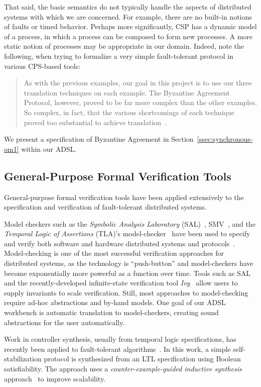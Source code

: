 That said, the basic semantics do not typically handle the aspects of distributed systems
with which we are concerned. For example, there are no built-in notions of
faults or timed behavior. Perhaps more significantly, CSP has a dynamic
model of a process, in which a process can be composed to form new processes. A
more static notion of processes may be appropriate in our domain. Indeed, note
the following, when trying to formalize a very simple fault-tolerant protocol in
various CPS-based tools:

\begin{quote}
As with the previous examples, our goal in this project is to use our three
translation techniques on each example. The Byzantine Agreement Protocol,
however, proved to be far more complex than the other examples. So complex, in
fact, that the various shortcomings of each technique proved too substantial to
achieve translation~\cite{csp-masters}.
\end{quote}
\noindent
We present a specification of Byzantine Agreement in Section~\ref{ssec:synchronous-om1} within our ADSL.

\subsection{General-Purpose Formal Verification Tools}
General-purpose formal verification tools have been applied extensively to the specification and verification of fault-tolerant distributed systems.

Model checkers such as the \emph{Symbolic Analysis Laboratory}
(SAL)~\cite{SRI:SAL}, SMV~\cite{nusmv}, and the \emph{Temporal Logic of
  Assertions} (TLA)'s model-checker~\cite{tla} have been used to specify and
verify both software and hardware distributed systems and
protocols~\cite{Rushby-OM1,pike-afm,brown_pike_06,pike_johnson:emsoft,amazon-tla,Dutertre-Sorea-2004}. Model-checking
is one of the most successful verification approaches for distributed systems,
as the technology is ``push-button'' and model-checkers have become
exponentially more powerful as a function over time. Tools such as SAL and the recently-developed infinite-state verification tool \emph{Ivy}~\cite{ivy} allow users to supply invariants to scale verification. Still, most approaches to
model-checking require ad-hoc abstractions and by-hand models. One goal of our
ADSL workbench is automatic translation to model-checkers, creating sound
abstractions for the user automatically.

Work in controller synthesis, usually from temporal logic specifications, has
recently been applied to fault-tolerant algorithms~\cite{BloemBJ16}. In this
work, a simple self-stabilization protocol is synthesized from an LTL
specification using Boolean satisfiability. The approach uses a \emph{counter-example-guided inductive
  synthesis} approach~\cite{Solar} to improve scalability.

